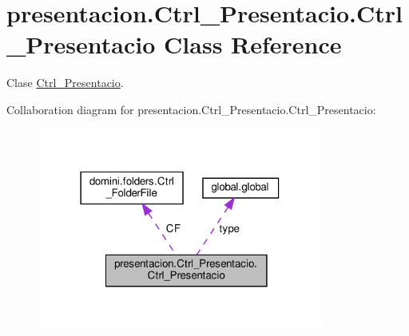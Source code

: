 \hypertarget{classpresentacion_1_1Ctrl__Presentacio_1_1Ctrl__Presentacio}{}\section{presentacion.\+Ctrl\+\_\+\+Presentacio.\+Ctrl\+\_\+\+Presentacio Class Reference}
\label{classpresentacion_1_1Ctrl__Presentacio_1_1Ctrl__Presentacio}


Clase \hyperlink{classpresentacion_1_1Ctrl__Presentacio_1_1Ctrl__Presentacio}{Ctrl\+\_\+\+Presentacio}.  




Collaboration diagram for presentacion.\+Ctrl\+\_\+\+Presentacio.\+Ctrl\+\_\+\+Presentacio\+:\nopagebreak
\begin{figure}[H]
\begin{center}
\leavevmode
\includegraphics[width=266pt]{classpresentacion_1_1Ctrl__Presentacio_1_1Ctrl__Presentacio__coll__graph}
\end{center}
\end{figure}
